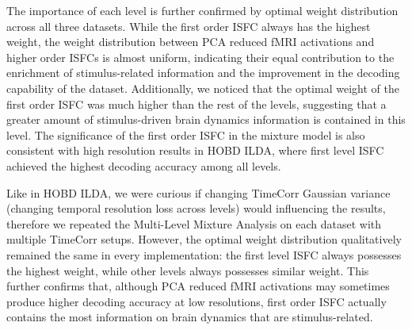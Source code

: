 \documentclass[11pt]{article}
\begin{document}
\begin{enumerate}
The importance of each level is further confirmed by optimal weight distribution across all three datasets. While the first order ISFC always has the highest weight, the weight distribution between PCA reduced fMRI activations and higher order ISFCs is almost uniform, indicating their equal contribution to the enrichment of stimulus-related information and the improvement in the decoding capability of the dataset. Additionally, we noticed that the optimal weight of the first order ISFC was much higher than the rest of the levels, suggesting that a greater amount of stimulus-driven brain dynamics information is contained in this level. The significance of the first order ISFC in the mixture model is also consistent with high resolution results in HOBD ILDA, where first level ISFC achieved the highest decoding accuracy among all levels.

Like in HOBD ILDA, we were curious if changing TimeCorr Gaussian variance (changing temporal resolution loss across levels) would influencing the results, therefore we repeated the Multi-Level Mixture Analysis on each dataset with multiple TimeCorr setups. However, the optimal weight distribution qualitatively remained the same in every implementation: the first level ISFC always possesses the highest weight, while other levels always possesses similar weight. This further confirms that, although PCA reduced fMRI activations may sometimes produce higher decoding accuracy at low resolutions, first order ISFC actually contains the most information on brain dynamics that are stimulus-related.


\clearpage
\newpage

\end{enumerate}
\end{document}
